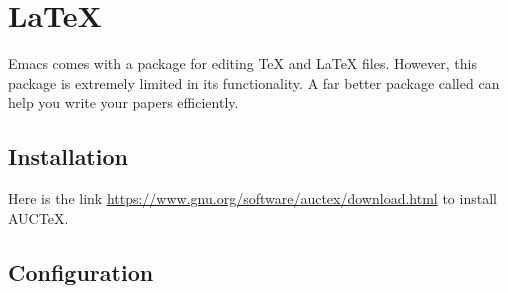 
\chapter{LaTeX}
\label{cha:latex}

Emacs comes with a package for editing \TeX\xspace and \LaTeX\xspace files.
However, this package is extremely limited in its functionality.
A far better package called \keyword{\auctex} can help you write your papers efficiently.


\section{Installation}
\label{sec:installation}

Here is the link \url{https://www.gnu.org/software/auctex/download.html} to install AUC\TeX.


\section{Configuration}
\label{sec:configuration}


